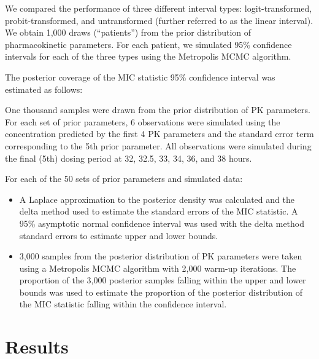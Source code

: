 \documentclass{article}\usepackage[]{graphicx}\usepackage[]{color}
\begin{document}
	We compared the performance of three different interval types: logit-transformed, probit-transformed, and untransformed (further referred to as the linear interval). We obtain 1,000 draws (``patients'') from the prior distribution of pharmacokinetic parameters. For each patient, we simulated 95\% confidence intervals for each of the three types using the Metropolis MCMC algorithm.

The posterior coverage of the MIC statistic 95\% confidence interval was estimated as follows:

One thousand samples were drawn from the prior distribution of PK parameters. For each set of prior parameters, 6 observations were simulated using the concentration predicted by the first 4 PK parameters and the standard error term corresponding to the 5th prior parameter. All observations were simulated during the final (5th) dosing period at 32, 32.5, 33, 34, 36, and 38 hours.

For each of the 50 sets of prior parameters and simulated data:

\begin{itemize}
	 \item A Laplace approximation to the posterior density was calculated and the delta method used to estimate the standard errors of the MIC statistic. A 95\% asymptotic normal confidence interval was used with the delta method standard errors to estimate upper and lower bounds.
	 \item 3,000 samples from the posterior distribution of PK parameters were taken using a Metropolis MCMC algorithm with 2,000 warm-up iterations. The proportion of the 3,000 posterior samples falling within the upper and lower bounds was used to estimate the proportion of the posterior distribution of the MIC statistic falling within the confidence interval.
\end{itemize}

\section{Results}
\end{document}
